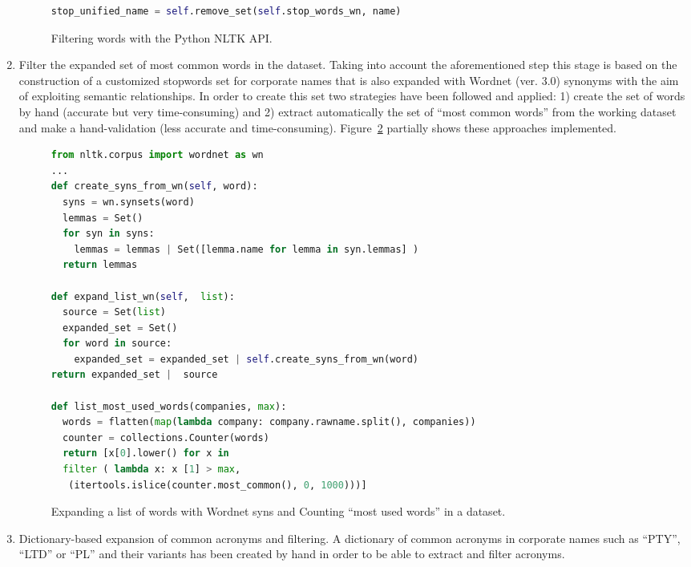 \documentclass{llncs}
\begin{document}
\begin{enumerate}
\begin{figure}[!h]
\begin{center}
\begin{lstlisting}[language=Python]
stop_unified_name = self.remove_set(self.stop_words_wn, name)
\end{lstlisting}
\caption{Filtering words with the Python NLTK API.}
\label{figure:step-2}
\end{center}
\end{figure}

\item Filter the expanded set of most common words in the dataset. Taking into account 
the aforementioned step this stage is based on the construction of a customized stopwords 
set for corporate names that is also expanded with Wordnet (ver. 3.0) synonyms with the aim of 
exploiting semantic relationships. In order to create this set two strategies have been followed and applied: 1) create the set 
of words by hand (accurate but very time-consuming) and 2) extract automatically the set of ``most common words'' from the 
working dataset and make a hand-validation (less accurate and time-consuming). Figure~\ref{figure:step-3} partially 
shows these approaches implemented.
    
\begin{figure}[!h]
\begin{center}
\begin{lstlisting}[language=Python]  
from nltk.corpus import wordnet as wn
...
def create_syns_from_wn(self, word):
  syns = wn.synsets(word) 
  lemmas = Set()
  for syn in syns:
    lemmas = lemmas | Set([lemma.name for lemma in syn.lemmas] )
  return lemmas

def expand_list_wn(self,  list):    
  source = Set(list)
  expanded_set = Set()
  for word in source:
    expanded_set = expanded_set | self.create_syns_from_wn(word)
return expanded_set |  source

def list_most_used_words(companies, max):
  words = flatten(map(lambda company: company.rawname.split(), companies))
  counter = collections.Counter(words)  
  return [x[0].lower() for x in 
  filter ( lambda x: x [1] > max, 
   (itertools.islice(counter.most_common(), 0, 1000)))]
\end{lstlisting}
\caption{Expanding a list of words with Wordnet syns and Counting ``most used words'' in a dataset.}
\label{figure:step-3}
\end{center}
\end{figure}

\item Dictionary-based expansion of common acronyms and filtering. A dictionary of common acronyms in corporate 
names such as ``PTY'', ``LTD'' or ``PL'' and their variants has been created by hand in order 
to be able to extract and filter acronyms. 


\end{enumerate}
\end{document}
